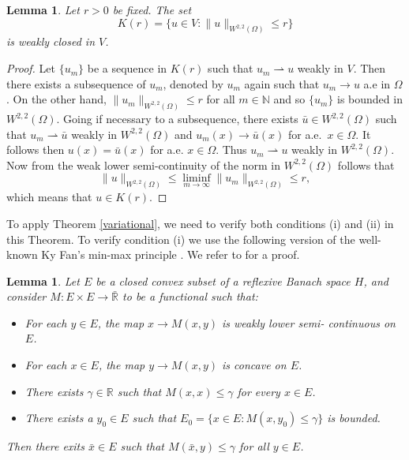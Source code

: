 \documentclass[10pt,a4paper]{amsart}
\numberwithin{equation}{section}
\newtheorem{lemma}[theorem]{Lemma}
\begin{document}
\begin{lemma}\label{Kclosed}
Let \(r > 0\) be fixed. The set
\[
K(r)=\{u\in V: \rVert u \rVert_{ W^{2,2}(\Omega)}\leq r\}
\]
is weakly closed in \(V\).
\end{lemma}

\begin{proof}
Let \(\{u_m\}\) be a sequence in \(K(r)\) such that \(u_m\rightharpoonup u\) weakly
in \(V\).
Then there exists a subsequence of \(u_m\), denoted by \(u_m\) again such that
\(u_m\to u\) a.e in \(\Omega\).
On the other hand,  \(\rVert u_m \rVert_{ W^{2,2}(\Omega)}\leq r\) for all
\(m \in \mathbb{N}\) and so  \(\{u_m\}\)
is bounded in \(W^{2,2}(\Omega)\). Going if necessary to a subsequence, there exists
\(\bar{u}  \in W^{2,2}(\Omega)\)  such that \(u_m \rightharpoonup \bar{u}\) weakly in
\(W^{2,2}(\Omega)\) and \(u_m(x) \to\bar{u}(x) \) for a.e.\
 \(x \in \Omega\). It follows then \(u(x)=\bar{u}(x) \) for a.e. \(x \in \Omega\).
Thus \(u_m \rightharpoonup u\) weakly in \(W^{2,2}(\Omega)\). Now from the
weak lower semi-continuity of the norm in \(W^{2,2}(\Omega)\)  follows that
\[
\rVert u \rVert_{ W^{2,2}(\Omega)}
\leq \liminf_{m\to\infty} \rVert u_m \rVert_{ W^{2,2}(\Omega)}\leq r ,
\]
which means that \(u\in K(r)\).
\end{proof}

To apply Theorem \ref{variational}, we need to verify both conditions (i)
and (ii) in this Theorem. To verify
condition (i) we  use the following version of the well-known Ky Fan's
min-max principle \cite{HB}. We refer to \cite[Lemma 12.1]{NG} for a proof.

\begin{lemma}\label{Ky Fan 2}
Let \(E\) be a closed convex subset of a reflexive Banach space \(H\), and consider
\(M : E \times E \to\bar{\mathbb{R}}\)
to be a functional such that:
\begin{itemize}
    \item[(1)] For each \(y\in E\), the map \(x \to M(x, y)\) is weakly lower semi-
     continuous on \(E\).
    \item[(2)] For each \(x \in E\), the map \(y \to M(x, y)\) is concave on \(E\).
    \item[(3)] There exists \( \gamma\in \mathbb{R}\) such that \(M(x, x) \leq \gamma\)
    for every  \(x \in E\).
    \item[(4)] There exists a \(y_0 \in E\) such that
     \(E_0 = \{x \in E : M(x, y_0) \leq \gamma\} \) is bounded.
\end{itemize}
Then there exits \(\bar{x} \in E\) such that \(M(\bar{x}, y) \leq \gamma\) for all
\(y \in E\).
\end{lemma}
\end{document}
